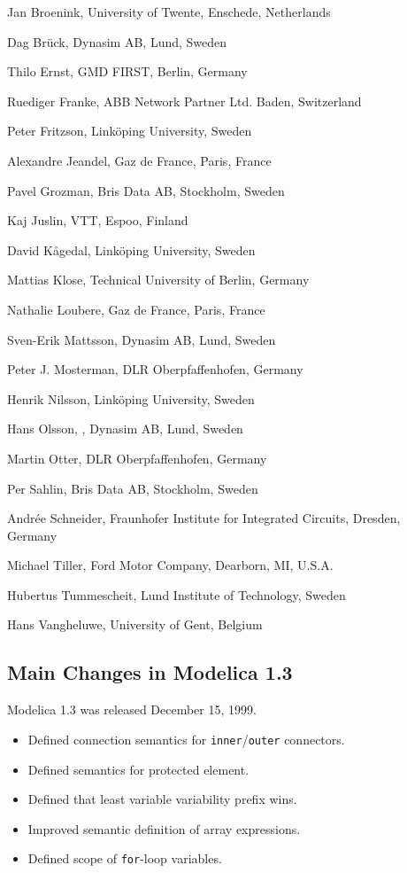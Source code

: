 Jan Broenink, University of Twente, Enschede, Netherlands

Dag Brück, Dynasim AB, Lund, Sweden

Thilo Ernst, GMD FIRST, Berlin, Germany

Ruediger Franke, ABB Network Partner Ltd. Baden, Switzerland

Peter Fritzson, Linköping University, Sweden

Alexandre Jeandel, Gaz de France, Paris, France

Pavel Grozman, Bris Data AB, Stockholm, Sweden

Kaj Juslin, VTT, Espoo, Finland

David Kågedal, Linköping University, Sweden

Mattias Klose, Technical University of Berlin, Germany

Nathalie Loubere, Gaz de France, Paris, France

Sven-Erik Mattsson, Dynasim AB, Lund, Sweden

Peter J. Mosterman, DLR Oberpfaffenhofen, Germany

Henrik Nilsson, Linköping University, Sweden

Hans Olsson, , Dynasim AB, Lund, Sweden

Martin Otter, DLR Oberpfaffenhofen, Germany

Per Sahlin, Bris Data AB, Stockholm, Sweden

Andrée Schneider, Fraunhofer Institute for Integrated Circuits, Dresden,
Germany

Michael Tiller, Ford Motor Company, Dearborn, MI, U.S.A.

Hubertus Tummescheit, Lund Institute of Technology, Sweden

Hans Vangheluwe, University of Gent, Belgium

\subsection{Main Changes in Modelica 1.3}\label{main-changes-in-modelica-1-3}

Modelica 1.3 was released December 15, 1999.
\begin{itemize}
\item
  Defined connection semantics for \lstinline!inner!/\lstinline!outer! connectors.
\item
  Defined semantics for protected element.
\item
  Defined that least variable variability prefix wins.
\item
  Improved semantic definition of array expressions.
\item
  Defined scope of \lstinline!for!-loop variables.
\end{itemize}

